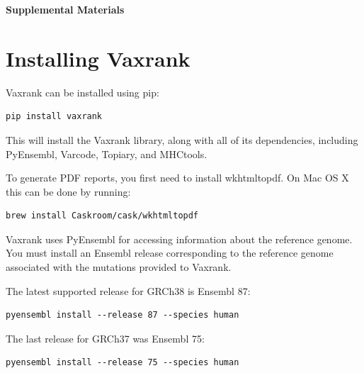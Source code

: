 \documentclass[10pt,letterpaper]{article}
\begin{document}




\pagebreak

\begin{center}
	\textbf{\large Supplemental Materials}
\end{center}

\setcounter{equation}{0}
\setcounter{figure}{0}
\setcounter{table}{0}
\setcounter{page}{1}
\makeatletter
\renewcommand{\theequation}{S\arabic{equation}}
\renewcommand{\thefigure}{S\arabic{figure}}
\renewcommand{\bibnumfmt}[1]{[S#1]}
\renewcommand{\citenumfont}[1]{S#1}

\section*{Installing Vaxrank}
Vaxrank can be installed using pip:

\begin{verbatim}
pip install vaxrank
\end{verbatim}

This will install the Vaxrank library, along with all of its dependencies, including PyEnsembl, Varcode, Topiary, and MHCtools. 

To generate PDF reports, you first need to install wkhtmltopdf. On Mac OS X this can be done by running: 
\begin{verbatim}
brew install Caskroom/cask/wkhtmltopdf
\end{verbatim}

Vaxrank uses PyEnsembl for accessing information about the reference genome. You must install an Ensembl release corresponding to the reference genome associated with the mutations provided to Vaxrank.

The latest supported release for GRCh38 is Ensembl 87:
\begin{verbatim}
pyensembl install --release 87 --species human
\end{verbatim}

The last release for GRCh37 was Ensembl 75:

\begin{verbatim}
pyensembl install --release 75 --species human
\end{verbatim}
\end{document}
